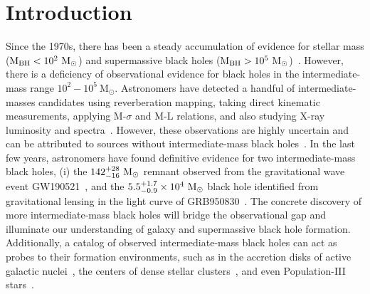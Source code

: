 \documentclass[%
 nofootinbib,
 amsmath,amssymb,
 aps,
 twocolumn
]{revtex4-2}
\newcommand{\mathcmd}[1]{{\sc \relax\ifmmode#1\else $#1$\fi}\xspace}
\newcommand{\msun}{\mathcmd{\text{M}_\odot}}
\begin{document}
\section{Introduction}
Since the 1970s, there has been a steady accumulation of evidence for stellar mass ($\text{M}_\text{BH} < 10^{2} \ \msun$) and supermassive black holes ($\text{M}_\text{BH} > 10^{5} \ \msun$)~\cite{Webster:1972:Natur, Balick:1974:ApJ, Ghez:1998:ApJ, Genzel:2010:RvMP, Abbott:2019:PhRvX, EventHorizonTelescopeCollaboration:2019:ApJL, Abbott:2020:arXiv}. However, there is a deficiency of observational evidence for black holes in the intermediate-mass range $10^{2} - 10^{5}\ \text{M}_{\odot}$. Astronomers have detected a handful of intermediate-masses candidates using reverberation mapping, taking direct kinematic measurements, applying  M-$\sigma$ and M-L relations, and also studying  X-ray luminosity and spectra~\cite{Greene:2004:ApJ, Graham:2013:ApJ, Mezcua:2017:IJMPD, Koliopanos:2017:mbhe, Lin:2020:ApJL, Greene:2020:ARA&A}. However, these observations are highly uncertain and can be attributed to sources without intermediate-mass black holes~\cite{kiziltan2017, freire2017}. In the last few years, astronomers have found definitive evidence for two intermediate-mass black holes, (i) the $142^{+28}_{-16}\ \msun$ remnant observed from the gravitational wave event GW190521~\cite{Abbott:2020:PhRvL}, and the $5.5^{+1.7}_{-0.9}\times10^{4}\ \msun$ black hole identified from gravitational lensing in the light curve of GRB950830~\cite{paynter_evidence_2021}. The concrete discovery of more intermediate-mass black holes will bridge the observational gap and illuminate our understanding of galaxy and supermassive black hole formation. Additionally, a catalog of observed intermediate-mass black holes can act as probes to their formation environments, such as in the accretion disks of active galactic nuclei~\cite{}, the centers of dense stellar clusters~\cite{}, and even Population-III stars~\cite{}. 


\end{document}
